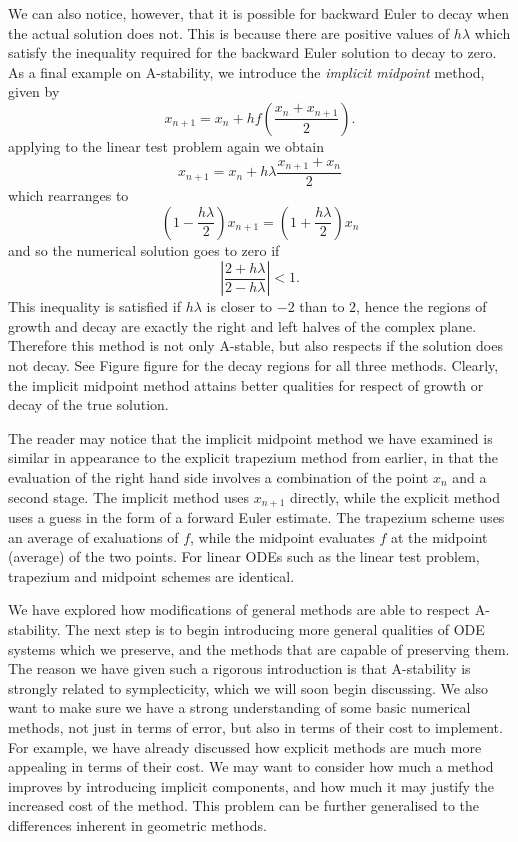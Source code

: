 \documentclass{report}
\theoremstyle{exampstyle} \newtheorem{example}[theorem]{Example}
\theoremstyle{exampstyle} \newtheorem{remark}[theorem]{Remark}
\theoremstyle{exampstyle} \newtheorem{definition}[theorem]{Definition}
\theoremstyle{exampstyle} \newtheorem{lemma}[theorem]{Lemma}
\begin{document}
We can also notice, however, that it is possible for backward Euler to decay when the actual solution does not.
This is because there are positive values of $h \lambda$ which satisfy the inequality required for the backward Euler solution to decay to zero.
As a final example on A-stability, we introduce the \textit{implicit midpoint} method, given by
\begin{equation}
    x_{n+1} = x_n + h f \left(
        \frac{x_n + x_{n+1}}{2}
    \right).
\end{equation} 
applying to the linear test problem again we obtain
\begin{equation*}
    x_{n+1} = x_n + h \lambda \frac{x_{n+1} + x_n}{2}
\end{equation*}
which rearranges to
\begin{equation*}
    \left( 1 - \frac{h \lambda}{2} \right) x_{n+1} = \left( 1 + \frac{h \lambda}{2} \right) x_n
\end{equation*}
and so the numerical solution goes to zero if
\begin{equation*}
    \left| \frac{2 + h \lambda}{2 - h \lambda} \right| < 1.
\end{equation*}
This inequality is satisfied if $h \lambda$ is closer to $-2$ than to $2$, hence the regions of growth and decay are exactly the right and left halves of the complex plane.
Therefore this method is not only A-stable, but also respects if the solution does not decay.
See Figure {figure} for the decay regions for all three methods.
Clearly, the implicit midpoint method attains better qualities for respect of growth or decay of the true solution.

The reader may notice that the implicit midpoint method we have examined is similar in appearance to the explicit trapezium method from earlier,
in that the evaluation of the right hand side involves a combination of the point $x_n$ and a second stage.
The implicit method uses $x_{n+1}$ directly, while the explicit method uses a guess in the form of a forward Euler estimate.
The trapezium scheme uses an average of exaluations of $f$, while the midpoint evaluates $f$ at the midpoint (average) of the two points.
For linear ODEs such as the linear test problem, trapezium and midpoint schemes are identical.

We have explored how modifications of general methods are able to respect A-stability.
The next step is to begin introducing more general qualities of ODE systems which we preserve, and the methods that are capable of preserving them.
The reason we have given such a rigorous introduction is that A-stability is strongly related to symplecticity, which we will soon begin discussing.
We also want to make sure we have a strong understanding of some basic numerical methods, not just in terms of error, but also in terms of their cost to implement.
For example, we have already discussed how explicit methods are much more appealing in terms of their cost.
We may want to consider how much a method improves by introducing implicit components, and how much it may justify the increased cost of the method.
This problem can be further generalised to the differences inherent in geometric methods.
\end{document}
